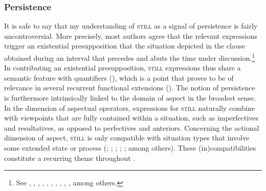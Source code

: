 \subsubsection{Persistence}
It is safe to say that my understanding of \textsc{still} as a signal of persistence is fairly uncontroversial. More precisely, most authors agree that the relevant expressions trigger an existential presupposition that the situation depicted in the clause obtained during an interval that precedes and abuts the time under discussion.\footnote{See \textcite{Abraham1980}, \textcite[38–42]{vanderAuwera1998}, \textcite{Doherty1973}, \textcite{Horn1970}, \textcite{Ippolito2004}, \textcite{Koenig1977}, \textcite[173–176]{Loebner1989}, \textcite{Mittwoch1993}, \textcite{Morrisey1973}, \textcite{Muller1975}, among others.} In contributing an existential presupposition, \textsc{still} expressions thus share a semantic feature with   quantifiers (), which is a point that proves to be of relevance in several recurrent functional extensions (). The notion of persistence is furthermore intrinsically linked to the domain of aspect in the broadest sense. In the dimension of aspectual operators, expressions for \textsc{still} naturally combine with viewpoints that are fully contained within a situation, such as imperfectives and resultatives, as opposed to perfectives and anteriors. Concerning the actional dimension of aspect, \textsc{still} is only compatible with situation types that involve some extended state or process (\cite[151–153]{vanBaar1997}; \cite[134]{Dahl1985}; \cite{Kratzer2000}; \cite{Loebner1989}; \cite{NedjalkovJaxontov1988}; among others). These (in)compatibilities constitute a recurring theme throughout .

